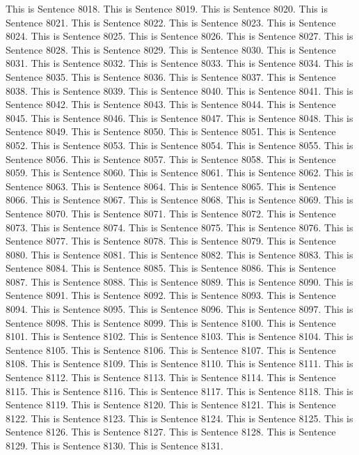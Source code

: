 \documentclass{article}
\begin{document}
This is Sentence 8018.
This is Sentence 8019.
This is Sentence 8020.
This is Sentence 8021.
This is Sentence 8022.
This is Sentence 8023.
This is Sentence 8024.
This is Sentence 8025.
This is Sentence 8026.
This is Sentence 8027.
This is Sentence 8028.
This is Sentence 8029.
This is Sentence 8030.
This is Sentence 8031.
This is Sentence 8032.
This is Sentence 8033.
This is Sentence 8034.
This is Sentence 8035.
This is Sentence 8036.
This is Sentence 8037.
This is Sentence 8038.
This is Sentence 8039.
This is Sentence 8040.
This is Sentence 8041.
This is Sentence 8042.
This is Sentence 8043.
This is Sentence 8044.
This is Sentence 8045.
This is Sentence 8046.
This is Sentence 8047.
This is Sentence 8048.
This is Sentence 8049.
This is Sentence 8050.
This is Sentence 8051.
This is Sentence 8052.
This is Sentence 8053.
This is Sentence 8054.
This is Sentence 8055.
This is Sentence 8056.
This is Sentence 8057.
This is Sentence 8058.
This is Sentence 8059.
This is Sentence 8060.
This is Sentence 8061.
This is Sentence 8062.
This is Sentence 8063.
This is Sentence 8064.
This is Sentence 8065.
This is Sentence 8066.
This is Sentence 8067.
This is Sentence 8068.
This is Sentence 8069.
This is Sentence 8070.
This is Sentence 8071.
This is Sentence 8072.
This is Sentence 8073.
This is Sentence 8074.
This is Sentence 8075.
This is Sentence 8076.
This is Sentence 8077.
This is Sentence 8078.
This is Sentence 8079.
This is Sentence 8080.
This is Sentence 8081.
This is Sentence 8082.
This is Sentence 8083.
This is Sentence 8084.
This is Sentence 8085.
This is Sentence 8086.
This is Sentence 8087.
This is Sentence 8088.
This is Sentence 8089.
This is Sentence 8090.
This is Sentence 8091.
This is Sentence 8092.
This is Sentence 8093.
This is Sentence 8094.
This is Sentence 8095.
This is Sentence 8096.
This is Sentence 8097.
This is Sentence 8098.
This is Sentence 8099.
This is Sentence 8100.
This is Sentence 8101.
This is Sentence 8102.
This is Sentence 8103.
This is Sentence 8104.
This is Sentence 8105.
This is Sentence 8106.
This is Sentence 8107.
This is Sentence 8108.
This is Sentence 8109.
This is Sentence 8110.
This is Sentence 8111.
This is Sentence 8112.
This is Sentence 8113.
This is Sentence 8114.
This is Sentence 8115.
This is Sentence 8116.
This is Sentence 8117.
This is Sentence 8118.
This is Sentence 8119.
This is Sentence 8120.
This is Sentence 8121.
This is Sentence 8122.
This is Sentence 8123.
This is Sentence 8124.
This is Sentence 8125.
This is Sentence 8126.
This is Sentence 8127.
This is Sentence 8128.
This is Sentence 8129.
This is Sentence 8130.
This is Sentence 8131.
\end{document}
